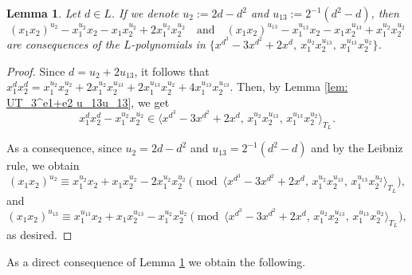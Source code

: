 \documentclass[a4paper,reqno]{amsart}
\newtheorem{lemma}[theorem]{Lemma}
\theoremstyle{definition}
\numberwithin{equation}{section}
\numberwithin{theorem}{section}
\begin{document}
\begin{lemma}\label{lem: u_2 u_13 on x_1x_2}
    Let $d\in L$. If we denote $u_{2}:=2d -d^2$ and $u_{13}:=2^{-1}(d^2 - d)$, then
    $$
(x_1 x_2)^{u_{2}}- x_1^{u_{2}} x_2 - x_1x_2^{u_{2}}+ 2x_1^{u_{2}} x_2^{u_{2}}
\quad \text{and} \quad 
(x_1 x_2)^{u_{13}}- x_1^{u_{13}} x_2 - x_1x_2^{u_{13}}+ x_1^{u_{2}} x_2^{u_{2}}
$$
are consequences of the $L$-polynomials in $\{  x^{d^3}-3x^{d^2}+2x^{d},\ x_1^{u_{2}}x_2^{u_{13}}, \ x_1^{u_{13}}x_2^{u_{2}} \}$.
\end{lemma}
\begin{proof}
Since $d=u_2 +2 u_{13}$, it follows that 
    $x_1^d x_2^d =x_1^{u_{2}}x_2^{u_{2}}+2 x_1^{u_{2}}x_2^{u_{13}} +2 x_1^{u_{13}}x_2^{u_{2}} +4 x_1^{u_{13}} x_2^{u_{13}}.$ Then, by Lemma \ref{lem: UT_3^e1+e2 u_13u_13}, we get 
      $$
    x_1^{d}x_2^{d}- x_1^{u_{2}} x_2^{u_{2}}\in \langle x^{d^3}-3x^{d^2}+2x^{d},\, x_1^{u_{2}}x_2^{u_{13}}, \, x_1^{u_{13}}x_2^{u_{2}}\rangle_{T_L}.
    $$


As a consequence, since $u_{2}=2d -d^2$ and $u_{13}=2^{-1}(d^2 - d)$ and by the Leibniz rule, we obtain
$$
(x_1 x_2)^{u_2}\equiv x_1^{u_{2}} x_2 + x_1x_2^{u_{2}}-2 x_1^{u_{2}} x_2^{u_{2}} \pmod{\langle x^{d^3}-3x^{d^2}+2x^{d},\, x_1^{u_{2}}x_2^{u_{13}}, \, x_1^{u_{13}}x_2^{u_{2}} \rangle_{T_L}},
$$
and
$$
(x_1 x_2)^{u_{13}}\equiv x_1^{u_{13}} x_2 + x_1x_2^{u_{13}}- x_1^{u_{2}} x_2^{u_{2}} \pmod{\langle x^{d^3}-3x^{d^2}+2x^{d},\, x_1^{u_{2}}x_2^{u_{13}}, \, x_1^{u_{13}}x_2^{u_{2}}  \rangle_{T_L}},
$$
as desired.
\end{proof}




As a direct consequence of Lemma \ref{lem: u_2 u_13 on x_1x_2} we obtain the following. 
\end{document}
